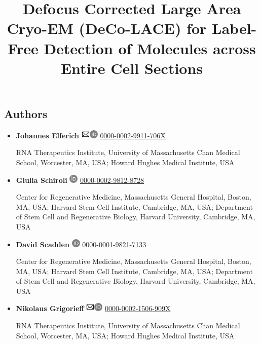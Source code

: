 \documentclass[
]{article}
\title{Defocus Corrected Large Area Cryo-EM (DeCo-LACE) for Label-Free Detection of Molecules across Entire Cell Sections}
\author{}
\date{}
\begin{document}
\maketitle

\hypertarget{authors}{%
\subsection{Authors}\label{authors}}

\begin{itemize}
\item
  \textbf{Johannes Elferich}
  \includegraphics[width=0.16667in,height=0.16667in]{images/envelope.pdf}\includegraphics[width=0.16667in,height=0.16667in]{images/orcid.pdf}
  \href{https://orcid.org/0000-0002-9911-706X}{0000-0002-9911-706X}

  RNA Therapeutics Institute, University of Massachusetts Chan Medical School, Worcester, MA, USA; Howard Hughes Medical Institute, USA
\item
  \textbf{Giulia Schiroli}
  \includegraphics[width=0.16667in,height=0.16667in]{images/orcid.pdf}
  \href{https://orcid.org/0000-0002-9812-8728}{0000-0002-9812-8728}

  Center for Regenerative Medicine, Massachusetts General Hospital, Boston, MA, USA; Harvard Stem Cell Institute, Cambridge, MA, USA; Department of Stem Cell and Regenerative Biology, Harvard University, Cambridge, MA, USA
\item
  \textbf{David Scadden}
  \includegraphics[width=0.16667in,height=0.16667in]{images/orcid.pdf}
  \href{https://orcid.org/0000-0001-9821-7133}{0000-0001-9821-7133}

  Center for Regenerative Medicine, Massachusetts General Hospital, Boston, MA, USA; Harvard Stem Cell Institute, Cambridge, MA, USA; Department of Stem Cell and Regenerative Biology, Harvard University, Cambridge, MA, USA
\item
  \textbf{Nikolaus Grigorieff}
  \includegraphics[width=0.16667in,height=0.16667in]{images/envelope.pdf}\includegraphics[width=0.16667in,height=0.16667in]{images/orcid.pdf}
  \href{https://orcid.org/0000-0002-1506-909X}{0000-0002-1506-909X}

  RNA Therapeutics Institute, University of Massachusetts Chan Medical School, Worcester, MA, USA; Howard Hughes Medical Institute, USA
\end{itemize}
\end{document}
